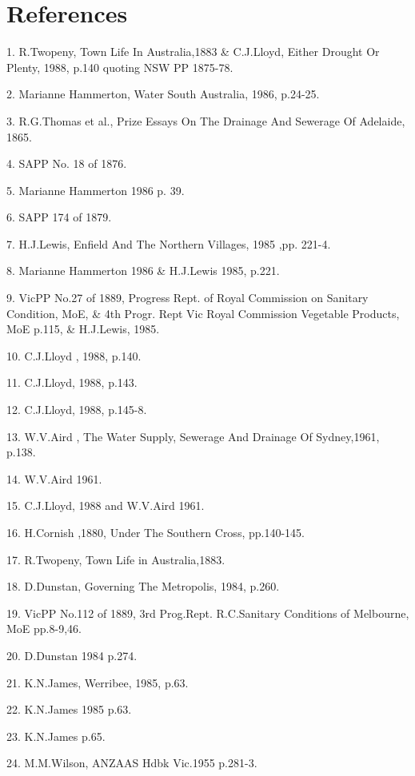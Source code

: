 \section{References}

1. R.Twopeny, Town Life In Australia,1883 \& C.J.Lloyd, Either Drought Or 
    Plenty, 1988, p.140 quoting NSW PP 1875-78.

2. Marianne Hammerton, Water South Australia, 1986, p.24-25.

3. R.G.Thomas et al., Prize Essays On The Drainage And Sewerage Of
    Adelaide, 1865. 

4. SAPP No. 18 of 1876. 

5. Marianne Hammerton 1986 p. 39.

6. SAPP 174 of 1879.

7. H.J.Lewis, Enfield And The Northern Villages, 1985 ,pp. 221-4.

8. Marianne Hammerton 1986 \& H.J.Lewis 1985, p.221.

9. VicPP No.27 of 1889, Progress Rept. of Royal Commission on Sanitary 
     Condition, MoE, \& 4th Progr. Rept Vic Royal Commission Vegetable 	
     Products, MoE p.115, \& H.J.Lewis, 1985.  	

10. C.J.Lloyd , 1988, p.140.

11. C.J.Lloyd, 1988,  p.143.

12. C.J.Lloyd, 1988, p.145-8.

13. W.V.Aird , The Water Supply, Sewerage And Drainage Of Sydney,1961,
       p.138.

14. W.V.Aird 1961.

15. C.J.Lloyd, 1988 and W.V.Aird 1961.

16. H.Cornish ,1880, Under The Southern Cross, pp.140-145.

17. R.Twopeny, Town Life in Australia,1883.

18. D.Dunstan, Governing The Metropolis, 1984, p.260.

19. VicPP No.112 of 1889, 3rd Prog.Rept. R.C.Sanitary  Conditions
      of Melbourne, MoE pp.8-9,46. 

20. D.Dunstan 1984 p.274.

21. K.N.James, Werribee, 1985, p.63.

22. K.N.James 1985 p.63.

23. K.N.James p.65.

24. M.M.Wilson, ANZAAS Hdbk Vic.1955 p.281-3.
